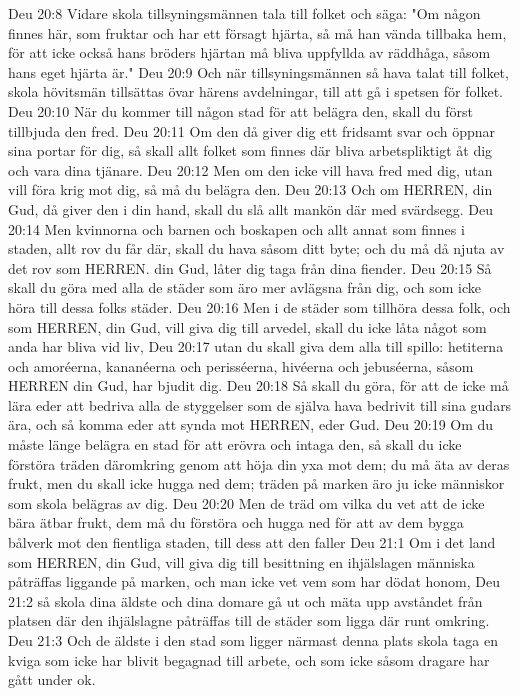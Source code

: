 Deu 20:8  Vidare skola tillsyningsmännen tala till folket och säga: "Om någon finnes här, som fruktar och har ett försagt hjärta, så må han vända tillbaka hem, för att icke också hans bröders hjärtan må bliva uppfyllda av räddhåga, såsom hans eget hjärta är."
Deu 20:9  Och när tillsyningsmännen så hava talat till folket, skola hövitsmän tillsättas övar härens avdelningar, till att gå i spetsen för folket.
Deu 20:10  När du kommer till någon stad för att belägra den, skall du först tillbjuda den fred.
Deu 20:11  Om den då giver dig ett fridsamt svar och öppnar sina portar för dig, så skall allt folket som finnes där bliva arbetspliktigt åt dig och vara dina tjänare.
Deu 20:12  Men om den icke vill hava fred med dig, utan vill föra krig mot dig, så må du belägra den.
Deu 20:13  Och om HERREN, din Gud, då giver den i din hand, skall du slå allt mankön där med svärdsegg.
Deu 20:14  Men kvinnorna och barnen och boskapen och allt annat som finnes i staden, allt rov du får där, skall du hava såsom ditt byte; och du må då njuta av det rov som HERREN. din Gud, låter dig taga från dina fiender.
Deu 20:15  Så skall du göra med alla de städer som äro mer avlägsna från dig, och som icke höra till dessa folks städer.
Deu 20:16  Men i de städer som tillhöra dessa folk, och som HERREN, din Gud, vill giva dig till arvedel, skall du icke låta något som anda har bliva vid liv,
Deu 20:17  utan du skall giva dem alla till spillo: hetiterna och amoréerna, kananéerna och perisséerna, hivéerna och jebuséerna, såsom HERREN din Gud, har bjudit dig.
Deu 20:18  Så skall du göra, för att de icke må lära eder att bedriva alla de styggelser som de själva hava bedrivit till sina gudars ära, och så komma eder att synda mot HERREN, eder Gud.
Deu 20:19  Om du måste länge belägra en stad för att erövra och intaga den, så skall du icke förstöra träden däromkring genom att höja din yxa mot dem; du må äta av deras frukt, men du skall icke hugga ned dem; träden på marken äro ju icke människor som skola belägras av dig.
Deu 20:20  Men de träd om vilka du vet att de icke bära ätbar frukt, dem må du förstöra och hugga ned för att av dem bygga bålverk mot den fientliga staden, till dess att den faller
Deu 21:1  Om i det land som HERREN, din Gud, vill giva dig till besittning en ihjälslagen människa påträffas liggande på marken, och man icke vet vem som har dödat honom,
Deu 21:2  så skola dina äldste och dina domare gå ut och mäta upp avståndet från platsen där den ihjälslagne påträffas till de städer som ligga där runt omkring.
Deu 21:3  Och de äldste i den stad som ligger närmast denna plats skola taga en kviga som icke har blivit begagnad till arbete, och som icke såsom dragare har gått under ok.
